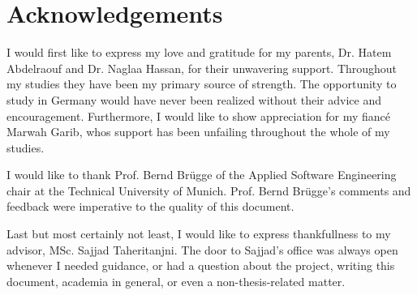 \documentclass[a4paper,12pt,twoside]{report}
\begin{document}
\setlength{\evensidemargin}{22pt}
\setlength{\oddsidemargin}{22pt}

\def\doctype{Master's Thesis}
\def\faculty{Informatik}
\def\title{Using Synthetic Data for Classification of Small Parts}
\def\titleGer{Verwendung synthetischer Daten für die Kleinteil-Erkennung}
\def\supervisor{Prof. Bernd Brügge, Ph.D.}
\def\advisor{Sajjad Taheritanjni, M.Sc.}
\def\author{Amr Abdelraouf}
\def\date{15.10.2018}



\lstset{showspaces=false, numbers=left, frame=single, basicstyle=\small}




\newpage
\thispagestyle{empty}
\mbox{}


\newpage
\thispagestyle{empty}
\mbox{}

\chapter*{Acknowledgements}
I would first like to express my love and gratitude for my parents, Dr. Hatem Abdelraouf and Dr. Naglaa Hassan, for their unwavering support. Throughout my studies they have been my primary source of strength. The opportunity to study in Germany would have never been realized without their advice and encouragement. Furthermore, I would like to show appreciation for my fiancé Marwah Garib, whos support has been unfailing throughout the whole of my studies.

I would like to thank Prof. Bernd Brügge of the Applied Software Engineering chair at the Technical University of Munich. Prof. Bernd Brügge's comments and feedback were imperative to the quality of this document.

Last but most certainly not least, I would like to express thankfullness to my advisor, MSc. Sajjad Taheritanjni. The door to Sajjad's office was always open whenever I needed guidance, or had a question about the project, writing this document, academia in general, or even a non-thesis-related matter.




\clearpage

\tableofcontents
\clearpage
\end{document}
